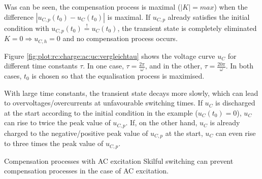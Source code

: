 \begin{frame}[t]
{    Was can be seen, the compensation process is maximal ($|K|=max$) when the difference $|u_{C,p}(t_0)- u_C(t_0)|$ is maximal.
    If $u_{C,p}$ already satisfies the initial condition with $u_{C,p}(t_0)\overset{!}{=}u_C(t_0)$, the transient state is completely eliminated $K=0 \Rightarrow u_{C,h}=0$ and no compensation process occurs.

    Figure \ref{fig:plot:rc:charge:ac:uc:vergleichtau} shows the voltage curve $u_C$ for different time constants $\tau$.
    In one case, $\tau=\frac{2\pi}{\omega}$, and in the other, $\tau=\frac{20\pi}{\omega}$.
    In both cases, $t_0$ is chosen so that the equalisation process is maximised.

    With large time constants, the transient state decays more slowly, which can lead to overvoltages/overcurrents at unfavourable switching times.
    If $u_C$ is discharged at the start according to the initial condition in the example ($u_C(t_0)=0$), $u_C$ can rise to twice the peak value of $u_{C,p}$.
    If, on the other hand, $u_C$ is already charged to the negative/positive peak value of $u_{C,p}$ at the start, $u_C$ can even rise to three times the peak value of $u_{C,p}$.

    \begin{Key point}{Compensation processes with AC excitation}
        Skilful switching can prevent compensation processes in the case of AC excitation.\vspace{5pt}


\end{Key point}}
\end{frame}
